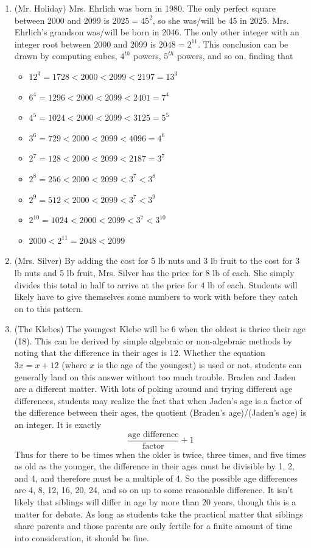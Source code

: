 {\begin{enumerate}
		\item (Mr. Holiday) Mrs. Ehrlich was born in 1980. The only perfect square between 2000 and 2099 is $2025=45^2$, so she was/will be 45 in 2025. Mrs. Ehrlich's grandson was/will be born in 2046. The only other integer with an integer root between 2000 and 2099 is $2048=2^{11}$. This conclusion can be drawn by computing cubes, $4^{th}$ powers, $5^{th}$ powers, and so on, finding that
		\begin{itemize}
			\item $12^3=1728<2000<2099<2197=13^3$
			\item $6^4=1296<2000<2099<2401=7^4$
			\item $4^5=1024<2000<2099<3125=5^5$
			\item $3^6=729<2000<2099<4096=4^6$
			\item $2^7=128<2000<2099<2187=3^7$
			\item $2^8=256<2000<2099<3^7<3^8$
			\item $2^9=512<2000<2099<3^7<3^9$
			\item $2^{10}=1024<2000<2099<3^7<3^{10}$
			\item $2000<2^{11}=2048<2099$
		\end{itemize}
		
		\item (Mrs. Silver) By adding the cost for 5 lb nuts and 3 lb fruit to the cost for 3 lb nuts and 5 lb fruit, Mrs. Silver has the price for 8 lb of each. She simply divides this total in half to arrive at the price for 4 lb of each. Students will likely have to give themselves some numbers to work with before they catch on to this pattern.
		
		\item (The Klebes) The youngest Klebe will be 6 when the oldest is thrice their age (18). This can be derived by simple algebraic or non-algebraic methods by noting that the difference in their ages is 12. Whether the equation $3x=x+12$ (where $x$ is the age of the youngest) is used or not, students can generally land on this answer without too much trouble. Braden and Jaden are a different matter. With lots of poking around and trying different age differences, students may realize the fact that when Jaden's age is a factor of the difference between their ages, the quotient (Braden's age)/(Jaden's age) is an integer. It is exactly $$\frac{\textrm{age difference}}{\textrm{factor}}+1$$ Thus for there to be times when the older is twice, three times, and five times as old as the younger, the difference in their ages must be divisible by 1, 2, and 4, and therefore must be a multiple of 4. So the possible age differences are 4, 8, 12, 16, 20, 24, and so on up to some reasonable difference. It isn't likely that siblings will differ in age by more than 20 years, though this is a matter for debate. As long as students take the practical matter that siblings share parents and those parents are only fertile for a finite amount of time into consideration, it should be fine.
		

\end{enumerate}}
